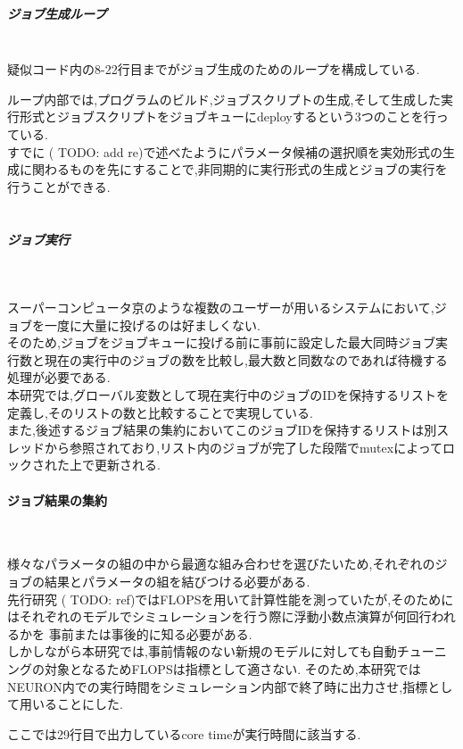 \subparagraph{ジョブ生成ループ}~\\
疑似コード内の8-22行目までがジョブ生成のためのループを構成している.\\
{\footnotesize

}
ループ内部では,プログラムのビルド,ジョブスクリプトの生成,そして生成した実行形式とジョブスクリプトをジョブキューにdeployするという3つのことを行っている.\\
すでに ( TODO: add re)で述べたようにパラメータ候補の選択順を実効形式の生成に関わるものを先にすることで,非同期的に実行形式の生成とジョブの実行を行うことができる.\\
\\
\subparagraph{ジョブ実行}~\\
{\footnotesize

}
スーパーコンピュータ京のような複数のユーザーが用いるシステムにおいて,ジョブを一度に大量に投げるのは好ましくない.\\
そのため,ジョブをジョブキューに投げる前に事前に設定した最大同時ジョブ実行数と現在の実行中のジョブの数を比較し,最大数と同数なのであれば待機する処理が必要である.\\
本研究では,グローバル変数として現在実行中のジョブのIDを保持するリストを定義し,そのリストの数と比較することで実現している.\\
また,後述するジョブ結果の集約においてこのジョブIDを保持するリストは別スレッドから参照されており,リスト内のジョブが完了した段階でmutexによってロックされた上で更新される.\\
\paragraph{ジョブ結果の集約}~\\
{\footnotesize

}
様々なパラメータの組の中から最適な組み合わせを選びたいため,それぞれのジョブの結果とパラメータの組を結びつける必要がある.\\
先行研究 ( TODO: ref)ではFLOPSを用いて計算性能を測っていたが,そのためにはそれぞれのモデルでシミュレーションを行う際に浮動小数点演算が何回行われるかを
事前または事後的に知る必要がある.\\
しかしながら本研究では,事前情報のない新規のモデルに対しても自動チューニングの対象となるためFLOPSは指標として適さない.
そのため,本研究ではNEURON内での実行時間をシミュレーション内部で終了時に出力させ,指標として用いることにした.\\
{\footnotesize

}
ここでは29行目で出力しているcore timeが実行時間に該当する.\\


